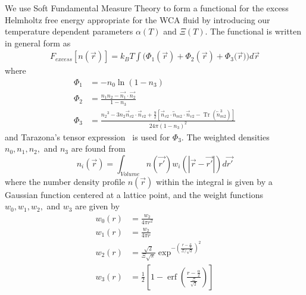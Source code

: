 \documentclass[double,12pt]{beavtex}
\begin{document}
We use Soft Fundamental Measure Theory to form a functional for the excess 
Helmholtz free energy appropriate for the WCA fluid by introducing our 
temperature dependent parameters $\alpha(T)$ and $\Xi(T)$. The functional 
is written in general form as 
\begin{align}
  F_{excess}[n(\vec{r})]=k_BT\int(\Phi_1(\vec{r})+\Phi_2(\vec{r})+\Phi_3(\vec{r}{)) d}\vec{r}
\end{align}
where
\begin{align}
\Phi_1 &= -n_{0}\ln(1-n_{3}) \\
\Phi_2 &= \frac{n_{1}n_{2}-\vec{n_{1}}\cdot\vec{n_{2}}}{1-n_{3}} \\
\Phi_3 &= \frac{{n_2}^3-3n_2\vec{n}_{v2}\cdot\vec{n}_{v2}+\frac{9}{2}[\vec{n}_{v2}\cdot{\overleftrightarrow{n}_{m2}}\cdot{\vec{n}_{v2}}-\operatorname{Tr}({\overleftrightarrow{n}^3_{m2}})]}{24\pi(1-n_3)^2}  
\end{align} 
and Tarazona's tensor expression~\cite{tarazonaphi3, santos2012phi3} is used 
for $\Phi_3$. The weighted densities $n_0, n_1, n_2,$ and $n_3$ are found from
\begin{equation}{n_i(\vec{r})=\int_{Volume}{n(\vec{r'})w_i(|\vec{r}-\vec{r'}|)d{\vec{r'}}}}\end{equation}
where the number density profile $n(\vec r)$ within the integral is given 
by a Gaussian function centered at a lattice point,
and the weight functions $w_0, w_1, w_2,$ and $w_3$ are given by
\begin{align}\label{eq:weights}
  w_{0}(r) &=\frac{w_{2}}{4\pi{r}^2} \\
  w_{1}(r) &=\frac{w_{2}}{4\pi{r}} \\
  w_2(r)&=\frac{\sqrt{2}}{\Xi\sqrt\pi}\exp^{-\left(\frac{r-\frac{\alpha}{2}}{\Xi/\sqrt{2}}\right)^2}
  \\
  w_3(r)&=\frac{1}{2}\left[1-\operatorname{erf}\left(\frac{r-\frac{\alpha}{2}}{\frac{\Xi}{\sqrt{2}}}\right)\right]
\end{align}
%
 \begin{figure}[h!]
    \centering
  \label{fig:GaussandW2_actual}
  \end{figure} 
\end{document}
